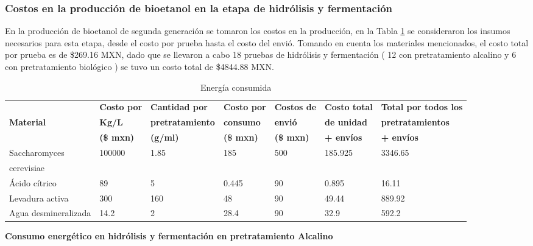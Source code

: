 \documentclass[12pt]{article}
\begin{document}
	\subsubsection{Costos en la producción de bioetanol en la etapa de hidrólisis y fermentación}
	
	En la producción de bioetanol de segunda generación se tomaron los costos en la producción, en la Tabla \ref{hidrolisis costos} se consideraron los insumos necesarios para esta etapa, desde el costo por prueba hasta el costo del envió. Tomando en cuenta los materiales mencionados, el costo total por prueba es de \$269.16 MXN, dado que se llevaron a cabo 18 pruebas de hidrólisis y fermentación ( 12 con pretratamiento alcalino y 6 con pretratamiento biológico ) se tuvo un costo total de \$4844.88 MXN.
	
			
			
			\begin{table}[H]
				\centering
				\caption{Energía consumida }
				\label{hidrolisis costos}
					\resizebox{16cm}{!} {
				\begin{tabular}{|l|l|l|l|l|l|l|}
					\hline
					 & \textbf{Costo por  } & \textbf{Cantidad por} & \textbf{Costo por} & \textbf{Costos de}  & \textbf{Costo total }  & \textbf{Total por todos los} \\ 
					
					\textbf{Material} & \textbf{Kg/L} & \textbf{pretratamiento } & \textbf{consumo} & \textbf{envió} & \textbf{ de unidad}  & \textbf{ pretratamientos } \\ 
							~ &  \textbf{ (\$ mxn) }&\textbf{(g/ml) }  & \textbf{(\$ mxn)} &  \textbf{(\$ mxn)} & \textbf{ + envíos}  & \textbf{ + envíos}\\ \hline
					Saccharomyces  & 100000 & 1.85 & 185 & 500 & 185.925 & 3346.65  \\ 
					 cerevisiae &  & &  &  &    &  \\ \hline
					Ácido cítrico & 89 & 5 & 0.445 & 90  & 0.895  & 16.11  \\ \hline
					Levadura activa & 300 & 160 & 48 & 90  & 49.44  & 889.92  \\ \hline
					Agua desmineralizada & 14.2 & 2 & 28.4 & 90  & 32.9  & 592.2  \\ \hline
				
				\end{tabular}}
			\end{table}
			
			
		\textbf{ Consumo energético en hidrólisis y fermentación en pretratamiento Alcalino }
		
\end{document}
